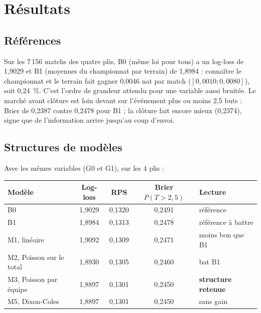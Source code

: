 
\chapter{Résultats}
\label{chap:resultats}

\section{Références}

Sur les 7\,156 matchs des quatre plis, B0 (même loi pour tous) a un log-loss de 1,9029 et B1 (moyennes
du championnat par terrain) de 1,8984 : connaître le championnat et le terrain fait gagner 0,0046 nat par
match (\([0{,}0010 ; 0{,}0080]\)), soit 0,24~\%. C'est l'ordre de grandeur attendu pour une variable aussi
bruitée. Le marché avant clôture est loin devant sur l'événement plus ou moins 2,5 buts : Brier de 0,2387
contre 0,2478 pour B1 ; la clôture fait encore mieux (0,2374), signe que de l'information arrive jusqu'au
coup d'envoi.

\section{Structures de modèles}
\label{sec:resultats-modeles}

Avec les mêmes variables (G0 et G1), sur les 4 plis :

\begin{center}
\begin{tabular}{lcccl}
\toprule
Modèle & Log-loss & RPS & Brier \(P(T > 2{,}5)\) & Lecture \\
\midrule
B0 & 1,9029 & 0,1320 & 0,2491 & référence \\
B1 & 1,8984 & 0,1313 & 0,2478 & référence à battre \\
M1, linéaire & 1,9092 & 0,1309 & 0,2471 & moins bon que B1 \\
M2, Poisson sur le total & 1,8930 & 0,1305 & 0,2460 & bat B1 \\
M3, Poisson par équipe & 1,8897 & 0,1301 & 0,2450 & \textbf{structure retenue} \\
M5, Dixon-Coles & 1,8897 & 0,1301 & 0,2450 & sans gain \\
\bottomrule
\end{tabular}
\end{center}

